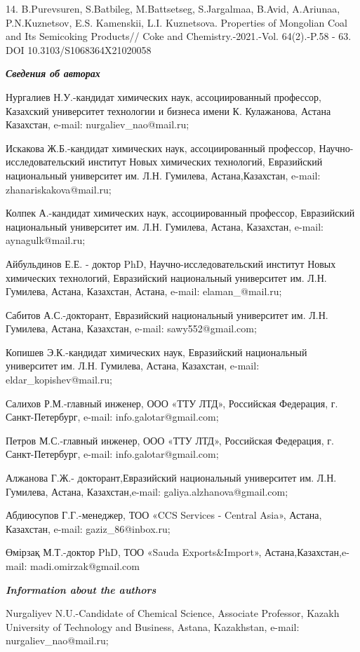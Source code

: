 14. B.Purevsuren, S.Batbileg, M.Battsetseg, S.Jargalmaa, B.Avid,
A.Ariunaa, P.N.Kuznetsov, E.S. Kamenskii, L.I. Kuznetsova. Properties of
Mongolian Coal and Its Semicoking Products// Coke and
Chemistry.-2021.-Vol. 64(2).-P.58 - 63. DOI 10.3103/S1068364X21020058

\emph{{\bfseries Сведения об авторах}}

Нургалиев Н.У.-кандидат химических наук, ассоциированный профессор,
Казахский университет технологии и бизнеса имени К. Кулажанова, Астана
Казахстан, e-mail: nurgaliev\_nao@mail.ru;

Искакова Ж.Б.-кандидат химических наук, ассоциированный профессор,
Научно-исследовательский институт Новых химических технологий,
Евразийский национальный университет им. Л.Н. Гумилева,
Астана,Казахстан, e-mail: zhanariskakova@mail.ru;

Колпек А.-кандидат химических наук, ассоциированный профессор,
Евразийский национальный университет им. Л.Н. Гумилева, Астана,
Казахстан, e-mail: aynagulk@mail.ru;

Айбульдинов Е.Е. - доктор PhD, Научно-исследовательский институт Новых
химических технологий, Евразийский национальный университет им. Л.Н.
Гумилева, Астана, Казахстан, Астана, e-mail: elaman\_@mail.ru;

Сабитов А.С.-докторант, Евразийский национальный университет им. Л.Н.
Гумилева, Астана, Казахстан, e-mail: sawy552@gmail.com;

Копишев Э.К.-кандидат химических наук, Евразийский национальный
университет им. Л.Н. Гумилева, Астана, Казахстан, e-mail:
eldar\_kopishev@mail.ru;

Салихов Р.М.-главный инженер, ООО «ТТУ ЛТД», Российская Федерация, г.
Санкт-Петербург, e-mail: info.galotar@gmail.com;

Петров М.С.-главный инженер, ООО «ТТУ ЛТД», Российская Федерация, г.
Санкт-Петербург, e-mail: info.galotar@gmail.com;

Алжанова Г.Ж.- докторант,Евразийский национальный университет им. Л.Н.
Гумилева, Астана, Казахстан,e-mail: galiya.alzhanova@gmail.com;

Абдиюсупов Г.Г.-менеджер, ТОО «CCS Services - Central Asia», Астана,
Казахстан, e-mail: gaziz\_86@inbox.ru;

Өмірзақ М.Т.-доктор PhD, ТОО «Sauda Exports\&Import»,
Астана,Казахстан,e-mail: madi.omirzak@gmail.com

\emph{{\bfseries Information about the authors}}

Nurgaliyev N.U.-Candidate of Chemical Science, Associate Professor,
Kazakh University of Technology and Business, Astana, Kazakhstan,
e-mail: nurgaliev\_nao@mail.ru;

